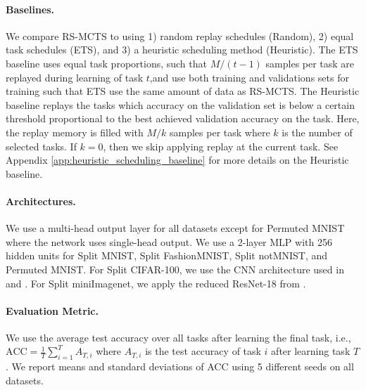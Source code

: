 \paragraph{Baselines.} We compare RS-MCTS to using 1) random replay schedules (Random), 2) equal task schedules (ETS), and 3) a heuristic scheduling method (Heuristic). The ETS baseline uses equal task proportions, such that $M/(t-1)$ samples per task are replayed during learning of task $t$,and use both training and validations sets for training such that ETS use the same amount of data as RS-MCTS. %
The Heuristic baseline replays the tasks which accuracy on the validation set is below a certain threshold proportional to the best achieved validation accuracy on the task. Here, the replay memory is filled with $M/k$ samples per task where $k$ is the number of selected tasks. If $k=0$, then we skip applying replay at the current task.  
See Appendix \ref{app:heuristic_scheduling_baseline} for more details on the Heuristic baseline. 



\vspace{-3mm}
\paragraph{Architectures.} We use a multi-head output layer for all datasets except for Permuted MNIST where the network uses single-head output. We use a 2-layer MLP with 256 hidden units for Split MNIST, Split FashionMNIST, Split notMNIST, and Permuted MNIST. For Split CIFAR-100, we use the CNN architecture used in \citet{vinyals2016matching} and \citet{schwarz2018progress}. For Split miniImagenet, we apply the reduced ResNet-18 from \citet{lopez2017gradient}. 

\vspace{-3mm}
\paragraph{Evaluation Metric.} We use the average test accuracy over all tasks after learning the final task, i.e., $\text{ACC} = \frac{1}{T} \sum_{i=1}^{T} A_{T, i}$ where $A_{T, i}$ is the test accuracy of task $i$ after learning task $T$. We report means and standard deviations of ACC using 5 different seeds on all datasets. 



